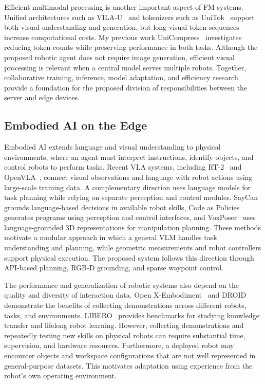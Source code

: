 \documentclass[11pt]{article}
\begin{document}
Efficient multimodal processing is another important aspect of FM systems. Unified architectures such as VILA-U~\cite{wu2025vilau} and tokenizers such as UniTok~\cite{ma2025unitok} support both visual understanding and generation, but long visual token sequences increase computational costs. My previous work UniCompress~\cite{unicompress2026} investigates reducing token counts while preserving performance in both tasks. Although the proposed robotic agent does not require image generation, efficient visual processing is relevant when a central model serves multiple robots. Together, collaborative training, inference, model adaptation, and efficiency research provide a foundation for the proposed division of responsibilities between the server and edge devices.

\subsection{Embodied AI on the Edge}
\label{subsec:embodied_edge}

Embodied AI extends language and visual understanding to physical environments, where an agent must interpret instructions, identify objects, and control robots to perform tasks. Recent VLA systems, including RT-2~\cite{brohan2023rt2} and OpenVLA~\cite{kim2024openvla}, connect visual observations and language with robot actions using large-scale training data. A complementary direction uses language models for task planning while relying on separate perception and control modules. SayCan~\cite{ahn2022saycan} grounds language-based decisions in available robot skills, Code as Policies~\cite{liang2022cap} generates programs using perception and control interfaces, and VoxPoser~\cite{huang2023voxposer} uses language-grounded 3D representations for manipulation planning. These methods motivate a modular approach in which a general VLM handles task understanding and planning, while geometric measurements and robot controllers support physical execution. The proposed system follows this direction through API-based planning, RGB-D grounding, and sparse waypoint control.

The performance and generalization of robotic systems also depend on the quality and diversity of interaction data. Open X-Embodiment~\cite{openx2024} and DROID~\cite{khazatsky2024droid} demonstrate the benefits of collecting demonstrations across different robots, tasks, and environments. LIBERO~\cite{liu2023libero} provides benchmarks for studying knowledge transfer and lifelong robot learning. However, collecting demonstrations and repeatedly testing new skills on physical robots can require substantial time, supervision, and hardware resources. Furthermore, a deployed robot may encounter objects and workspace configurations that are not well represented in general-purpose datasets. This motivates adaptation using experience from the robot's own operating environment.
\end{document}
